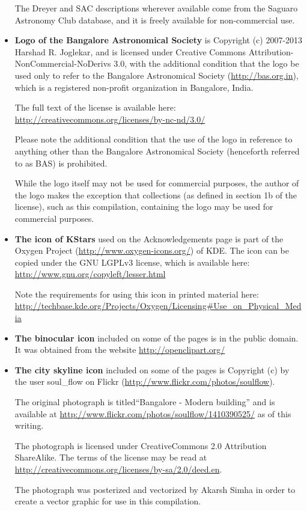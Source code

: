 \begin{itemize}
  The Dreyer and SAC descriptions wherever available come from the
  Saguaro Astronomy Club database, and it is freely available for
  non-commercial use.

\item \textbf{Logo of the Bangalore Astronomical Society} is Copyright
  (c) 2007-2013 Harshad R. Joglekar, and is licensed under Creative
  Commons Attribution-NonCommercial-NoDerivs 3.0, with the additional
  condition that the logo be used only to refer to the Bangalore
  Astronomical Society (\url{http://bas.org.in}), which is a
  registered non-profit organization in Bangalore, India. 

  The full text of the license is available here:
  \url{http://creativecommons.org/licenses/by-nc-nd/3.0/}

  Please note the additional condition that the use of the logo in
  reference to anything other than the Bangalore Astronomical Society
  (henceforth referred to as BAS) is prohibited.

  While the logo itself may not be used for commercial purposes, the
  author of the logo makes the exception that collections (as defined
  in section 1b of the license), such as this compilation, containing
  the logo may be used for commercial purposes.

\item \textbf{The icon of KStars} used on the Acknowledgements page is
  part of the Oxygen Project (\url{http://www.oxygen-icons.org/}) of
  KDE. The icon can be copied under the GNU LGPLv3 license, which is
  available here: \url{http://www.gnu.org/copyleft/lesser.html}

  Note the requirements for using this icon in printed material here:
  \url{http://techbase.kde.org/Projects/Oxygen/Licensing#Use_on_Physical_Media}

\item \textbf{The binocular icon} included on some of the pages is in
  the public domain. It was obtained from the website
  \url{http://openclipart.org/}
  
\item \textbf{The city skyline icon} included on some of the pages is
  Copyright (c) by the user soul\_flow on Flickr
  (\url{http://www.flickr.com/photos/soulflow}).

  The original photograph is titled``Bangalore - Modern building'' and
  is available at
  \url{http://www.flickr.com/photos/soulflow/1410390525/} as of this
  writing.

  The photograph is licensed under CreativeCommons 2.0 Attribution
  ShareAlike. The terms of the license may be read at
  \url{http://creativecommons.org/licenses/by-sa/2.0/deed.en}.

  The photograph was posterized and vectorized by Akarsh Simha in
  order to create a vector graphic for use in this compilation.

\end{itemize}

